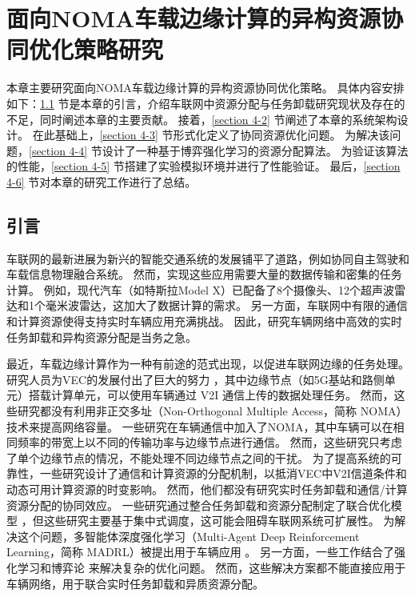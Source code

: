 \chapter{面向NOMA车载边缘计算的异构资源协同优化策略研究}
本章主要研究面向NOMA车载边缘计算的异构资源协同优化策略。
具体内容安排如下：\ref{section 4-1} 节是本章的引言，介绍车联网中资源分配与任务卸载研究现状及存在的不足，同时阐述本章的主要贡献。
接着，\ref{section 4-2} 节阐述了本章的系统架构设计。
在此基础上，\ref{section 4-3} 节形式化定义了协同资源优化问题。
为解决该问题，\ref{section 4-4} 节设计了一种基于博弈强化学习的资源分配算法。
为验证该算法的性能，\ref{section 4-5} 节搭建了实验模拟环境并进行了性能验证。
最后，\ref{section 4-6} 节对本章的研究工作进行了总结。
\section{引言}\label{section 4-1}

车联网的最新进展为新兴的智能交通系统的发展铺平了道路，例如协同自主驾驶\cite{bagheri20215g}和车载信息物理融合系统\cite{mugabarigira2023context}。
然而，实现这些应用需要大量的数据传输和密集的任务计算。
例如，现代汽车（如特斯拉Model X）已配备了8个摄像头、12个超声波雷达和1个毫米波雷达，这加大了数据计算的需求。
另一方面，车联网中有限的通信和计算资源使得支持实时车辆应用充满挑战。
因此，研究车辆网络中高效的实时任务卸载和异构资源分配是当务之急。

最近，车载边缘计算\cite{lang2022cooperative}作为一种有前途的范式出现，以促进车联网边缘的任务处理。
研究人员为VEC的发展付出了巨大的努力 \cite{liu2021fog, dai2021edge, zhang2022digital, liu2020adaptive, liu2018coding}，其中边缘节点（如5G基站和路侧单元）搭载计算单元，可以使用车辆通过 V2I 通信上传的数据处理任务。
然而，这些研究都没有利用非正交多址（Non-Orthogonal Multiple Access，简称 NOMA）\cite{islam2017power}技术来提高网络容量。
一些研究在车辆通信中加入了NOMA\cite{patel2021performance, zhang2021centralized, zhu2021decentralized, liu2019energy}，其中车辆可以在相同频率的带宽上以不同的传输功率与边缘节点进行通信。
然而，这些研究只考虑了单个边缘节点的情况，不能处理不同边缘节点之间的干扰。
为了提高系统的可靠性，一些研究设计了通信和计算资源的分配机制，以抵消VEC中V2I信道条件和动态可用计算资源的时变影响\cite{liu2021rtds, liu2022a, chen2020robust, liu2014temporal, liu2016cooperative}。
然而，他们都没有研究实时任务卸载和通信/计算资源分配的协同效应。
一些研究通过整合任务卸载和资源分配制定了联合优化模型 \cite{dai2021asynchronous, dai2022a}，但这些研究主要基于集中式调度，这可能会阻碍车联网系统可扩展性。
为解决这个问题，多智能体深度强化学习（Multi-Agent Deep Reinforcement Learning，简称 MADRL）\cite{kumar2022multi}被提出用于车辆应用 \cite{alam2022multi, zhang2021adaptive, nie2021semi}。
另一方面，一些工作结合了强化学习和博弈论 \cite{zheng2022stackelberg, albaba2021driver, rajeswaran2020a}来解决复杂的优化问题。
然而，这些解决方案都不能直接应用于车辆网络，用于联合实时任务卸载和异质资源分配。

